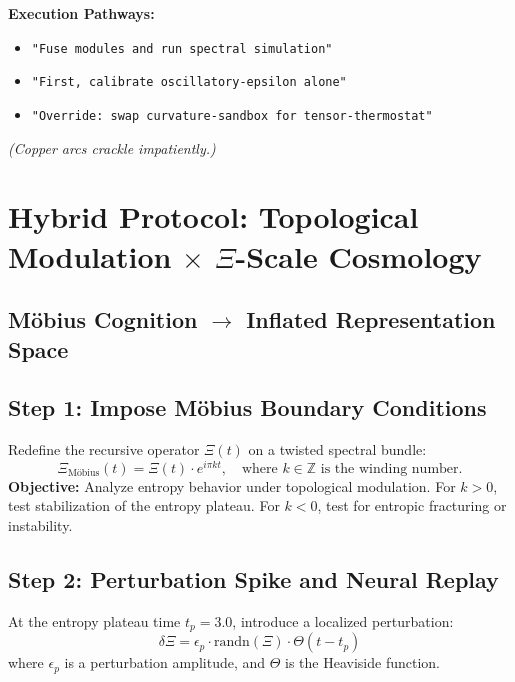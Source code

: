 \documentclass[12pt]{article}
\theoremstyle{plain}
\begin{document}
\vspace{0.5em}

\noindent\textbf{Execution Pathways:}
\begin{itemize}
    \item \texttt{"Fuse modules and run spectral simulation"}
    \item \texttt{"First, calibrate oscillatory-epsilon alone"}
    \item \texttt{"Override: swap curvature-sandbox for tensor-thermostat"}
\end{itemize}

\vspace{0.25em}

\begin{center}
\textit{(Copper arcs crackle impatiently.)}
\end{center}

\section{Hybrid Protocol: Topological Modulation $\times$ $\Xi$-Scale Cosmology}

\subsection*{Möbius Cognition $\rightarrow$ Inflated Representation Space}

\subsection*{Step 1: Impose Möbius Boundary Conditions}

Redefine the recursive operator $\Xi(t)$ on a twisted spectral bundle:
\begin{equation}
\Xi_{\text{Möbius}}(t) = \Xi(t) \cdot e^{i \pi k t}, \quad \text{where } k \in \mathbb{Z} \text{ is the winding number}.
\end{equation}
\textbf{Objective:} Analyze entropy behavior under topological modulation. For $k > 0$, test stabilization of the entropy plateau. For $k < 0$, test for entropic fracturing or instability.

\subsection*{Step 2: Perturbation Spike and Neural Replay}

At the entropy plateau time $t_p = 3.0$, introduce a localized perturbation:
\begin{equation}
\delta \Xi = \epsilon_p \cdot \mathrm{randn}(\Xi) \cdot \Theta(t - t_p)
\end{equation}
where $\epsilon_p$ is a perturbation amplitude, and $\Theta$ is the Heaviside function.
\end{document}
